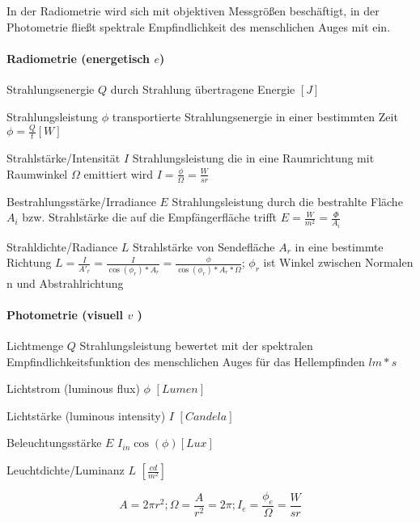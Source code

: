 \documentclass[landscape]{article}
\begin{document}
\begin{multicols}{3}
  In der Radiometrie wird sich mit objektiven Messgrößen beschäftigt, in der Photometrie fließt spektrale Empfindlichkeit des menschlichen Auges mit ein.
  
  \paragraph{Radiometrie (energetisch $e$) }
  \begin{description*}
    \item[Strahlungsenergie $Q$] durch Strahlung übertragene Energie $[J]$
    \item[Strahlungsleistung $\phi$] transportierte Strahlungsenergie in einer bestimmten Zeit $\phi = \frac{Q}{t} [W]$
    \item[Strahlstärke/Intensität $I$] Strahlungsleistung die in eine Raumrichtung mit Raumwinkel $\Omega$ emittiert wird $I=\frac{\phi}{\Omega}=\frac{W}{sr}$
    \item[Bestrahlungsstärke/Irradiance $E$] Strahlungsleistung durch die bestrahlte Fläche $A_i$ bzw. Strahlstärke die auf die Empfängerfläche trifft $E=\frac{W}{m^2}=\frac{\Phi}{A_i}$
    \item[Strahldichte/Radiance $L$] Strahlstärke von Sendefläche $A_r$ in eine bestimmte Richtung $L = \frac{I}{A'_r}=\frac{I}{\cos(\phi_r)*A_r} = \frac{\phi}{\cos(\phi_r)*A_r*\Omega}$; $\phi_r$ ist Winkel zwischen Normalen n und Abstrahlrichtung
  \end{description*}
  
  \paragraph{Photometrie (visuell $v$ )}
  \begin{description*}
    \item[Lichtmenge $Q$] Strahlungsleistung bewertet mit der spektralen Empfindlichkeitsfunktion des menschlichen Auges für das Hellempfinden $lm*s$
    \item[Lichtstrom (luminous flux) $\phi$] $[Lumen]$
    \item[Lichtstärke (luminous intensity) $I$] $[Candela]$
    \item[Beleuchtungsstärke $E$] $I_{in}\cos(\phi) [Lux]$
    \item[Leuchtdichte/Luminanz $L$] $[\frac{cd}{m^2}]$
  \end{description*}
  
  $$A=2\pi r^2; \Omega=\frac{A}{r^2}=2\pi ; I_e=\frac{\phi_e}{\Omega}= \frac{W}{sr}$$
  

\end{multicols}
\end{document}
